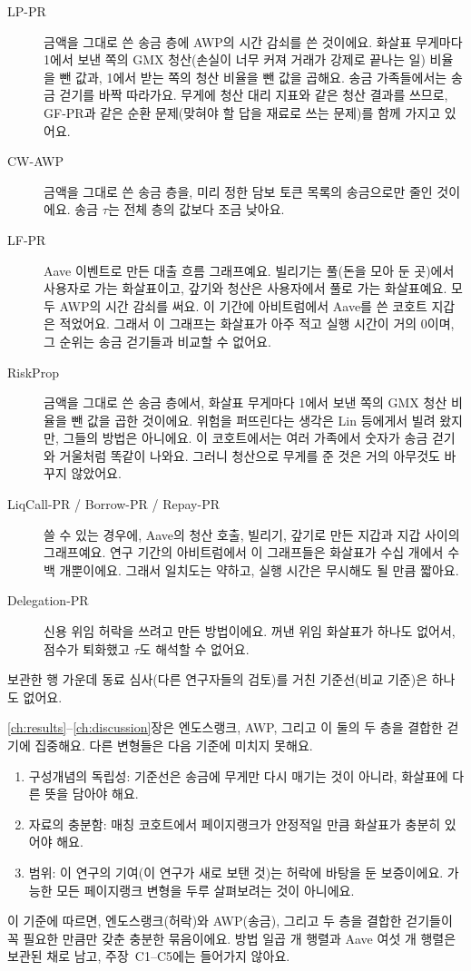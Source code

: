 \begin{description}
\item[LP-PR] 금액을 그대로 쓴 송금 층에 AWP의 시간 감쇠를 쓴 것이에요. 화살표 무게마다 1에서 보낸 쪽의 GMX 청산(손실이 너무 커져 거래가 강제로 끝나는 일) 비율을 뺀 값과, 1에서 받는 쪽의 청산 비율을 뺀 값을 곱해요. 송금 가족들에서는 송금 걷기를 바짝 따라가요. 무게에 청산 대리 지표와 같은 청산 결과를 쓰므로, GF-PR과 같은 순환 문제(맞혀야 할 답을 재료로 쓰는 문제)를 함께 가지고 있어요.
\item[CW-AWP] 금액을 그대로 쓴 송금 층을, 미리 정한 담보 토큰 목록의 송금으로만 줄인 것이에요. 송금 $\tau$는 전체 층의 값보다 조금 낮아요.
\item[LF-PR] Aave 이벤트로 만든 대출 흐름 그래프예요. 빌리기는 풀(돈을 모아 둔 곳)에서 사용자로 가는 화살표이고, 갚기와 청산은 사용자에서 풀로 가는 화살표예요. 모두 AWP의 시간 감쇠를 써요. 이 기간에 아비트럼에서 Aave를 쓴 코호트 지갑은 적었어요. 그래서 이 그래프는 화살표가 아주 적고 실행 시간이 거의 0이며, 그 순위는 송금 걷기들과 비교할 수 없어요.
\item[RiskProp] 금액을 그대로 쓴 송금 층에서, 화살표 무게마다 1에서 보낸 쪽의 GMX 청산 비율을 뺀 값을 곱한 것이에요. 위험을 퍼뜨린다는 생각은 Lin 등에게서 빌려 왔지만, 그들의 방법은 아니에요. 이 코호트에서는 여러 가족에서 숫자가 송금 걷기와 거울처럼 똑같이 나와요. 그러니 청산으로 무게를 준 것은 거의 아무것도 바꾸지 않았어요.
\item[LiqCall-PR / Borrow-PR / Repay-PR] 쓸 수 있는 경우에, Aave의 청산 호출, 빌리기, 갚기로 만든 지갑과 지갑 사이의 그래프예요. 연구 기간의 아비트럼에서 이 그래프들은 화살표가 수십 개에서 수백 개뿐이에요. 그래서 일치도는 약하고, 실행 시간은 무시해도 될 만큼 짧아요.
\item[Delegation-PR] 신용 위임 허락을 쓰려고 만든 방법이에요. 꺼낸 위임 화살표가 하나도 없어서, 점수가 퇴화했고 $\tau$도 해석할 수 없어요.
\end{description}

보관한 행 가운데 동료 심사(다른 연구자들의 검토)를 거친 기준선(비교 기준)은 하나도 없어요.


\ref{ch:results}--\ref{ch:discussion}장은 엔도스랭크, AWP, 그리고 이 둘의 두 층을 결합한 걷기에 집중해요. 다른 변형들은 다음 기준에 미치지 못해요.

\begin{enumerate}
\item 구성개념의 독립성: 기준선은 송금에 무게만 다시 매기는 것이 아니라, 화살표에 다른 뜻을 담아야 해요.
\item 자료의 충분함: 매칭 코호트에서 페이지랭크가 안정적일 만큼 화살표가 충분히 있어야 해요.
\item 범위: 이 연구의 기여(이 연구가 새로 보탠 것)는 허락에 바탕을 둔 보증이에요. 가능한 모든 페이지랭크 변형을 두루 살펴보려는 것이 아니에요.
\end{enumerate}

이 기준에 따르면, 엔도스랭크(허락)와 AWP(송금), 그리고 두 층을 결합한 걷기들이 꼭 필요한 만큼만 갖춘 충분한 묶음이에요. 방법 일곱 개 행렬과 Aave 여섯 개 행렬은 보관된 채로 남고, 주장~C1--C5에는 들어가지 않아요.

